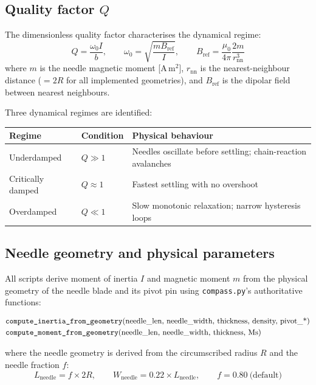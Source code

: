 \documentclass[11pt,a4paper]{article}
\newcommand{\code}[1]{\texttt{#1}}
\begin{document}
\subsection{Quality factor $Q$}

The dimensionless quality factor characterises the dynamical regime:
\begin{equation}
  Q = \frac{\omega_0 I}{b}, \qquad
  \omega_0 = \sqrt{\frac{m B_{\mathrm{ref}}}{I}}, \qquad
  B_{\mathrm{ref}} = \frac{\mu_0}{4\pi}\frac{2m}{r_{\mathrm{nn}}^3}
\end{equation}
where $m$ is the needle magnetic moment [A\,m$^2$], $r_{\mathrm{nn}}$ is the
nearest-neighbour distance ($= 2R$ for all implemented geometries), and
$B_{\mathrm{ref}}$ is the dipolar field between nearest neighbours.

\medskip
\noindent Three dynamical regimes are identified:

\begin{center}
\begin{tabular}{lll}
\toprule
Regime & Condition & Physical behaviour \\
\midrule
Underdamped & $Q \gg 1$ & Needles oscillate before settling; chain-reaction avalanches \\
Critically damped & $Q \approx 1$ & Fastest settling with no overshoot \\
Overdamped & $Q \ll 1$ & Slow monotonic relaxation; narrow hysteresis loops \\
\bottomrule
\end{tabular}
\end{center}

\subsection{Needle geometry and physical parameters}

All scripts derive moment of inertia $I$ and magnetic moment $m$ from the
physical geometry of the needle blade and its pivot pin using
\texttt{compass.py}'s authoritative functions:

\begin{align}
  &\text{\code{compute\_inertia\_from\_geometry}(needle\_len, needle\_width, thickness,
    density, pivot\_*)} \label{eq:inertia}\\
  &\text{\code{compute\_moment\_from\_geometry}(needle\_len, needle\_width, thickness, Ms)}
    \label{eq:moment}
\end{align}

\noindent where the needle geometry is derived from the circumscribed radius $R$
and the needle fraction $f$:
\begin{equation}
  L_{\mathrm{needle}} = f \times 2R, \qquad
  W_{\mathrm{needle}} = 0.22 \times L_{\mathrm{needle}}, \qquad
  f = 0.80\ \text{(default)}
\end{equation}
\end{document}
